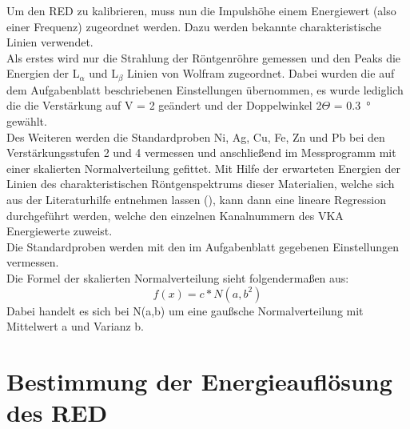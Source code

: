 Um den RED zu kalibrieren, muss nun die Impulshöhe einem Energiewert (also einer Frequenz) zugeordnet werden. Dazu werden bekannte charakteristische Linien verwendet.\\
Als erstes wird nur die Strahlung der Röntgenröhre gemessen und den Peaks die Energien der L$_\alpha$ und L$_\beta$ Linien von Wolfram zugeordnet. Dabei wurden die auf dem Aufgabenblatt beschriebenen Einstellungen übernommen, es wurde lediglich die die Verstärkung auf V = 2 geändert und der Doppelwinkel 2$\Theta$ = \SI{0.3}{\degree} gewählt.\\
Des Weiteren werden die Standardproben Ni, Ag, Cu, Fe, Zn und Pb bei den Verstärkungsstufen 2 und 4 vermessen und anschließend im Messprogramm 
mit einer skalierten Normalverteilung gefittet. Mit Hilfe der erwarteten Energien der Linien des charakteristischen Röntgenspektrums dieser Materialien, welche sich aus der Literaturhilfe entnehmen lassen (\cite{litmap}), kann dann eine lineare Regression durchgeführt werden, welche den einzelnen Kanalnummern des VKA Energiewerte zuweist.\\
Die Standardproben werden mit den im Aufgabenblatt gegebenen Einstellungen vermessen.\\
Die Formel der skalierten Normalverteilung sieht folgenderma\ss en aus:
\begin{equation}
	f(x) = c*N(a,b^2)
	\label{gauss_scale}
\end{equation}
Dabei handelt es sich bei N(a,b) um eine gau\ss sche Normalverteilung mit Mittelwert a und Varianz b.

\section{Bestimmung der Energieauflösung des RED}

